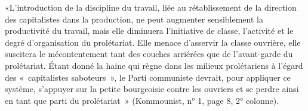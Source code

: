 \documentclass[french,twoside]{book} %
\newenvironment{quoteblock}%
  {\begin{quoting}}
  {\end{quoting}}
\newenvironment{quotebar}{%
    \def\FrameCommand{{\color{rubric!10!}\vrule width 0.5em} \hspace{0.9em}}%
    \def\OuterFrameSep{\itemsep} %
    \MakeFramed {\advance\hsize-\width \FrameRestore}
  }%
  {%
    \endMakeFramed
  }
\renewenvironment{quoteblock}%
  {%
    \savenotes
    \setstretch{0.9}
    \normalfont
    \begin{quotebar}
  }
  {%
    \end{quotebar}
    \spewnotes
  }
\begin{document}
\begin{quoteblock}
 \noindent «L'introduction de la discipline du travail, liée au rétablissement de la direction des capitalistes dans la production, ne peut augmenter sensiblement la productivité du travail, mais elle diminuera l’initiative de classe, l’activité et le degré d’organisation du prolétariat. Elle menace d’asservir la classe ouvrière, elle suscitera le mécontentement tant des couches arriérées que de l’avant‑garde du prolétariat. Étant donné la haine qui règne dans les milieux prolétariens à l’égard des « capitalistes saboteurs », le Parti communiste devrait, pour appliquer ce système, s’appuyer sur la petite bourgeoisie contre les ouvriers et se perdre ainsi en tant que parti du prolétariat » (Kommounist, n° 1, page 8, 2° colonne).
\end{quoteblock}
\end{document}
